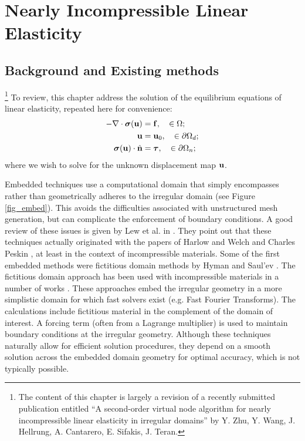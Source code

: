 %

\chapter{Nearly Incompressible Linear Elasticity} \label{ch:pt2.LE}

\section{Background and Existing methods} \label{sec:ch5.background}

\footnote{The content of this chapter is largely a revision of a recently submitted publication entitled ``A second-order virtual node
algorithm for nearly incompressible linear elasticity in irregular domains'' by Y. Zhu, Y. Wang, J. Hellrung, A. Cantarero, E. Sifakis, J. Teran.}
To review, this chapter address the solution of the equilibrium equations of linear elasticity, repeated here for convenience:
\begin{subequations} \label{eq:ch5.elasticity}
\begin{align}
-\nabla \cdot \boldsymbol{\sigma}(\mathbf{u}) & = \mathbf{f}, \quad \in \Omega; \\
\mathbf{u} & = \mathbf{u}_0, \quad \in \partial\Omega_d; \\
\boldsymbol{\sigma}(\mathbf{u}) \cdot \hat{\mathbf{n}} & = \boldsymbol{\tau}, \quad \in \partial\Omega_n;
\end{align}
\end{subequations}
where we wish to solve for the unknown displacement map $\mathbf{u}$.

Embedded techniques use a computational domain that simply encompasses rather than geometrically adheres to the irregular domain (see Figure \ref{fig_embed}). This avoids the difficulties associated with unstructured mesh generation, but can complicate the enforcement of boundary conditions. A good review of these issues is given by Lew et al. in \cite{lew2008discontinuous}. They point out that these techniques actually originated with the papers of Harlow and Welch \cite{Harlow:1965:NCO} and Charles Peskin \cite{peskin1971}, at least in the context of incompressible materials. Some of the first embedded methods were fictitious domain methods by Hyman \cite{hyman1952} and Saul'ev \cite{saulev1963}. The fictitious domain approach has been used with incompressible materials in a number of works \cite{glowinski1999distributed,glowinski1994fictitiousNS,glowinski2001,Parussini:2009,Parussini:2008,Bertrand1997,teran2009tether, biros2004fast,rutka2008staggered}. These approaches embed the irregular geometry in a more simplistic domain for which fast solvers exist (e.g. Fast Fourier Transforms). The calculations include fictitious material in the complement of the domain of interest. A forcing term (often from a Lagrange multiplier) is used to maintain boundary conditions at the irregular geometry. Although these techniques naturally allow for efficient solution procedures, they depend on a smooth solution across the embedded domain geometry for optimal accuracy, which is not typically possible.

